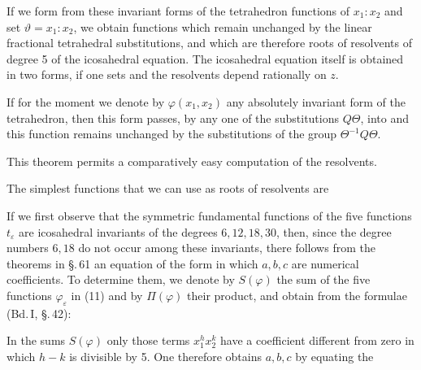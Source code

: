 
If we form from these invariant forms of the tetrahedron functions of $x_1:x_2$ and set $\vartheta = x_1:x_2$, we obtain functions which remain unchanged by the linear fractional tetrahedral substitutions, and which are therefore roots of resolvents of degree 5 of the icosahedral equation. The icosahedral equation itself is obtained in two forms, if one sets
and the resolvents depend rationally on $z$.

If for the moment we denote by $\varphi(x_1, x_2)$ any absolutely invariant form of the tetrahedron, then this form passes, by any one of the substitutions $Q\Theta$, into
and this function remains unchanged by the substitutions of the group $\Theta^{-1}Q\Theta$.


This theorem permits a comparatively easy computation of the resolvents.

The simplest functions that we can use as roots of resolvents are

If we first observe that the symmetric fundamental functions of the five functions $t_\varepsilon$ are icosahedral invariants of the degrees $6, 12, 18, 30$, then, since the degree numbers $6, 18$ do not occur among these invariants, there follows from the theorems in \S.\,61 an equation of the form
in which $a, b, c$ are numerical coefficients. To determine them, we denote by $S(\varphi)$ the sum of the five functions $\varphi_\varepsilon$ in (11) and by $\Pi(\varphi)$ their product, and obtain from the  formulae (Bd.\,I, \S.\,42):

In the sums $S(\varphi)$ only those terms $x_1^h x_2^k$ have a coefficient different from zero in which $h - k$ is divisible by 5. One therefore obtains $a, b, c$ by equating the
